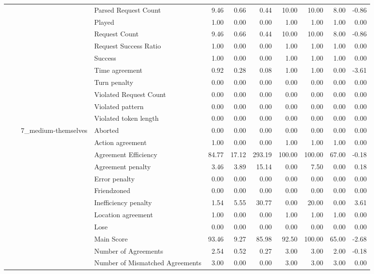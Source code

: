 \begin{tabular}{llllrrrrrrr}
 &  &  & Parsed Request Count & 9.46 & 0.66 & 0.44 & 10.00 & 10.00 & 8.00 & -0.86 \\
 &  &  & Played & 1.00 & 0.00 & 0.00 & 1.00 & 1.00 & 1.00 & 0.00 \\
 &  &  & Request Count & 9.46 & 0.66 & 0.44 & 10.00 & 10.00 & 8.00 & -0.86 \\
 &  &  & Request Success Ratio & 1.00 & 0.00 & 0.00 & 1.00 & 1.00 & 1.00 & 0.00 \\
 &  &  & Success & 1.00 & 0.00 & 0.00 & 1.00 & 1.00 & 1.00 & 0.00 \\
 &  &  & Time agreement & 0.92 & 0.28 & 0.08 & 1.00 & 1.00 & 0.00 & -3.61 \\
 &  &  & Turn penalty & 0.00 & 0.00 & 0.00 & 0.00 & 0.00 & 0.00 & 0.00 \\
 &  &  & Violated Request Count & 0.00 & 0.00 & 0.00 & 0.00 & 0.00 & 0.00 & 0.00 \\
 &  &  & Violated pattern & 0.00 & 0.00 & 0.00 & 0.00 & 0.00 & 0.00 & 0.00 \\
 &  &  & Violated token length & 0.00 & 0.00 & 0.00 & 0.00 & 0.00 & 0.00 & 0.00 \\
\cline{3-11}
 &  & \multirow[t]{27}{*}{7_medium-themselves} & Aborted & 0.00 & 0.00 & 0.00 & 0.00 & 0.00 & 0.00 & 0.00 \\
 &  &  & Action agreement & 1.00 & 0.00 & 0.00 & 1.00 & 1.00 & 1.00 & 0.00 \\
 &  &  & Agreement Efficiency & 84.77 & 17.12 & 293.19 & 100.00 & 100.00 & 67.00 & -0.18 \\
 &  &  & Agreement penalty & 3.46 & 3.89 & 15.14 & 0.00 & 7.50 & 0.00 & 0.18 \\
 &  &  & Error penalty & 0.00 & 0.00 & 0.00 & 0.00 & 0.00 & 0.00 & 0.00 \\
 &  &  & Friendzoned & 0.00 & 0.00 & 0.00 & 0.00 & 0.00 & 0.00 & 0.00 \\
 &  &  & Inefficiency penalty & 1.54 & 5.55 & 30.77 & 0.00 & 20.00 & 0.00 & 3.61 \\
 &  &  & Location agreement & 1.00 & 0.00 & 0.00 & 1.00 & 1.00 & 1.00 & 0.00 \\
 &  &  & Lose & 0.00 & 0.00 & 0.00 & 0.00 & 0.00 & 0.00 & 0.00 \\
 &  &  & Main Score & 93.46 & 9.27 & 85.98 & 92.50 & 100.00 & 65.00 & -2.68 \\
 &  &  & Number of Agreements & 2.54 & 0.52 & 0.27 & 3.00 & 3.00 & 2.00 & -0.18 \\
 &  &  & Number of Mismatched Agreements & 3.00 & 0.00 & 0.00 & 3.00 & 3.00 & 3.00 & 0.00 \\

\end{tabular}
